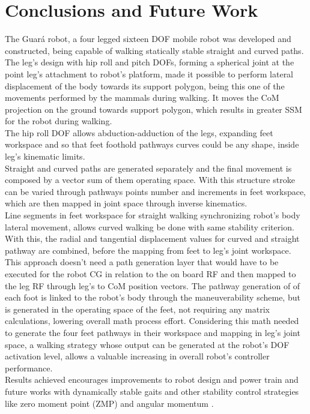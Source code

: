 \section{Conclusions and Future Work}
The Guar\'a robot, a four legged sixteen DOF mobile robot was developed and constructed, being capable of walking statically stable straight and curved paths.  \\
The leg's design with hip roll and pitch DOFs, forming a spherical joint at the point leg's attachment to robot's platform, made it possible to perform lateral displacement of the body towards its support polygon, being this one of the movements performed by the mammals during walking. It moves the CoM projection on the ground towards support polygon, which results in greater SSM for the robot during walking.\\
The hip roll DOF allows abduction-adduction of the legs, expanding feet workspace and so that feet foothold pathways curves could be any shape, inside leg's kinematic limits.\\
Straight and curved paths are generated separately and the final movement is composed by a vector sum of them operating space. With this structure stroke can be varied through pathways points number and  increments in feet workspace, which are then mapped in joint space through inverse kinematics.\\
Line segments in feet workspace for straight walking synchronizing robot's body lateral movement, allows curved walking be done with same stability criterion. With this, the radial and tangential displacement values ​​for curved and straight pathway are combined, before the mapping from feet  to leg's joint workspace. This approach doesn't need a path generation layer that would have to be executed for the robot CG in relation to the on board RF and then mapped to the leg RF through leg's to CoM position vectors. The pathway generation of of each foot is linked to the robot's body through the maneuverability scheme, but is generated in the operating space of the feet, not requiring any matrix calculations, lowering overall math process effort.
Considering this math needed to generate the four feet pathways in their workspace and mapping in leg's joint space, a walking strategy whose output can be generated at the robot's DOF activation level, allows a valuable increasing in overall robot's controller performance.\\
Results achieved encourages improvements to robot design and power train and future works with dynamically stable gaits and other stability control strategies like zero moment point (ZMP) and angular momentum \cite{byl2008,popovic_angular_2004,popovic_ground_2005}. \\

